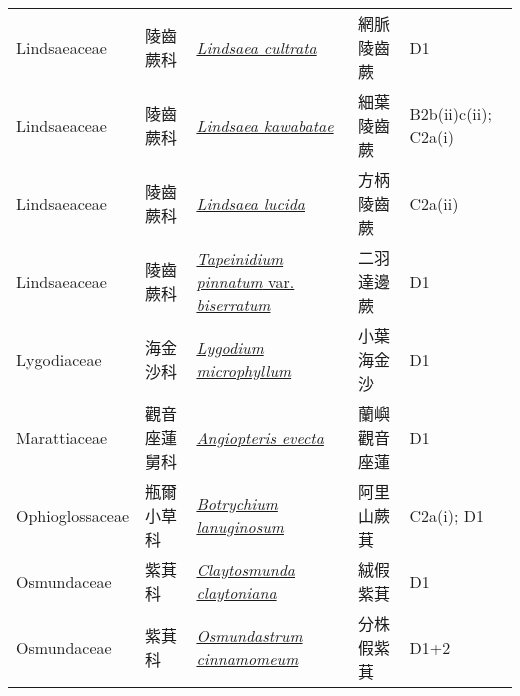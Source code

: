 {\begin{longtable}{p{2.5cm}p{2cm}p{5cm}p{2.5cm}p{3cm}}
    Lindsaeaceae & 陵齒蕨科 & \href{http://www.theplantlist.org/tpl1.1/search?q=Lindsaea+cultrata}{\textit{Lindsaea cultrata} } & 網脈陵齒蕨 & D1 \index{Lindsaea@\textit{Lindsaea}!cultrata@\textit{cultrata}}  \index{網脈陵齒蕨} \\
    Lindsaeaceae & 陵齒蕨科 & \href{http://www.theplantlist.org/tpl1.1/search?q=Lindsaea+kawabatae}{\textit{Lindsaea kawabatae} } & 細葉陵齒蕨 & B2b(ii)c(ii); C2a(i) \index{Lindsaea@\textit{Lindsaea}!kawabatae@\textit{kawabatae}}  \index{細葉陵齒蕨} \\
    Lindsaeaceae & 陵齒蕨科 & \href{http://www.theplantlist.org/tpl1.1/search?q=Lindsaea+lucida}{\textit{Lindsaea lucida} } & 方柄陵齒蕨 & C2a(ii) \index{Lindsaea@\textit{Lindsaea}!lucida@\textit{lucida}}  \index{方柄陵齒蕨} \\
    Lindsaeaceae & 陵齒蕨科 & \href{http://www.theplantlist.org/tpl1.1/search?q=Tapeinidium+pinnatum+var.+biserratum}{\textit{Tapeinidium pinnatum} var. \textit{biserratum} } & 二羽達邊蕨 & D1 \index{Tapeinidium@\textit{Tapeinidium}!pinnatum@\textit{pinnatum}!var. biserratum@var. \textit{biserratum}}  \index{二羽達邊蕨} \\
    Lygodiaceae & 海金沙科 & \href{http://www.theplantlist.org/tpl1.1/search?q=Lygodium+microphyllum}{\textit{Lygodium microphyllum} } & 小葉海金沙 & D1 \index{Lygodium@\textit{Lygodium}!microphyllum@\textit{microphyllum}}  \index{小葉海金沙} \\
    Marattiaceae & 觀音座蓮舅科 & \href{http://www.theplantlist.org/tpl1.1/search?q=Angiopteris+evecta}{\textit{Angiopteris evecta} } & 蘭嶼觀音座蓮 & D1 \index{Angiopteris@\textit{Angiopteris}!evecta@\textit{evecta}}  \index{蘭嶼觀音座蓮} \\
    Ophioglossaceae & 瓶爾小草科 & \href{http://www.theplantlist.org/tpl1.1/search?q=Botrychium+lanuginosum}{\textit{Botrychium lanuginosum} } & 阿里山蕨萁 & C2a(i); D1 \index{Botrychium@\textit{Botrychium}!lanuginosum@\textit{lanuginosum}}  \index{阿里山蕨萁} \\
    Osmundaceae & 紫萁科 & \href{http://www.theplantlist.org/tpl1.1/search?q=Claytosmunda+claytoniana}{\textit{Claytosmunda claytoniana} } & 絨假紫萁 & D1 \index{Claytosmunda@\textit{Claytosmunda}!claytoniana@\textit{claytoniana}}  \index{絨假紫萁} \\
    Osmundaceae & 紫萁科 & \href{http://www.theplantlist.org/tpl1.1/search?q=Osmundastrum+cinnamomeum}{\textit{Osmundastrum cinnamomeum} } & 分株假紫萁 & D1+2 \index{Osmundastrum@\textit{Osmundastrum}!cinnamomeum@\textit{cinnamomeum}}  \index{分株假紫萁} \\

\end{longtable}}
